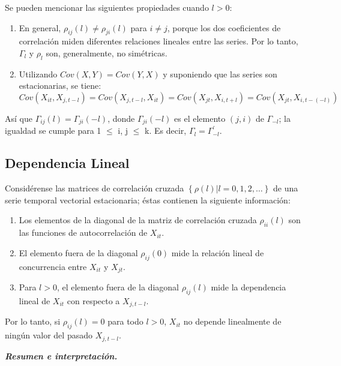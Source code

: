 Se pueden mencionar las siguientes propiedades cuando $l>0$:

\begin{enumerate}
\item En general, $\rho_{ij}\left( l \right)\neq \rho_{ji}\left( l \right)$ para $i\neq j$, porque los dos coeficientes de correlaci\'{o}n miden diferentes relaciones lineales entre las series. Por lo tanto, $\Gamma_{l}$ y $\rho_{l}$ son, generalmente, no sim\'{e}tricas.
\item Utilizando $Cov\left(X, Y\right)=Cov\left(Y, X\right)$ y suponiendo que las series son estacionarias, se tiene:
\[
Cov(X_{it}, X_{j,t-l})=Cov\left(X_{j,t-l}, X_{it}\right)=Cov\left(X_{jt}, X_{i,t+l}\right)=Cov\left(X_{jt}, X_{i,t-\left( -l\right)} \right)
\]
\end{enumerate}

As\'{i} que $\Gamma_{ij}(l)=\Gamma_{ji}(-l)$, donde $\Gamma_{ji}(-l)$ es el elemento $(j, i)$ de $\Gamma_{-l}$; la igualdad se cumple para 1 $\leq$ i, j $\leq$ k. Es decir, $\Gamma_{l}=\Gamma_{-l}^{'}$.

\subsection{Dependencia Lineal}
\label{subsubsec:mylabel3}

Consid\'{e}rense las matrices de correlaci\'{o}n cruzada $\left\{\rho(l)\vert 
l=0, 1, 2,\ldots \right\}$ de una serie temporal vectorial estacionaria; \'{e}stas contienen la siguiente informaci\'{o}n:

\begin{enumerate}
\item Los elementos de la diagonal de la matriz de correlaci\'{o}n cruzada $\rho_{ii}\left( l \right)$ son las funciones de autocorrelaci\'{o}n de $X_{it}$.
\item El elemento fuera de la diagonal $\rho_{ij}(0)$ mide la relaci\'{o}n lineal de concurrencia entre $X_{it}$ y $X_{jt}$.
\item Para $l>0$, el elemento fuera de la diagonal $\rho_{ij}\left( l \right)$ mide la dependencia lineal de $X_{it}$ con respecto a $X_{j,t-l}$.
\end{enumerate}

Por lo tanto, si $\rho_{ij}\left( l \right)=0$ para todo $l>0$, $X_{it}$ no depende linealmente de ning\'{u}n valor del pasado $X_{j,t-l}$.\newline

\textbf{\textit{Resumen e interpretaci\'{o}n.}}\newline

